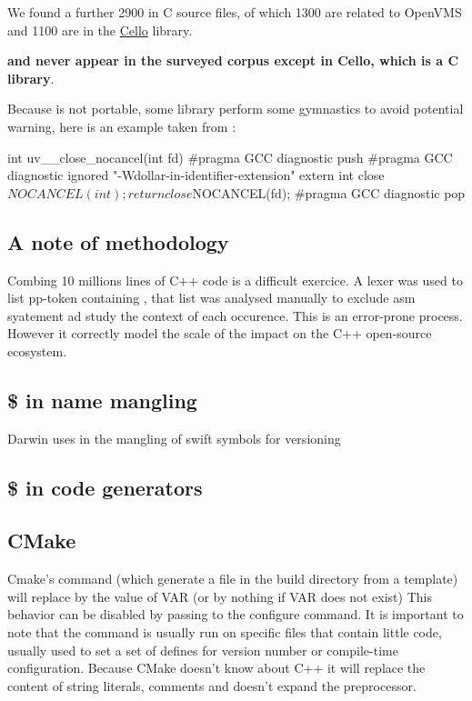 \documentclass{wg21}
\begin{document}
    We found a further 2900 \tcode{\$} in C source files, of which 1300 are related to OpenVMS and 1100 are in the \href{http://libcello.org/}{Cello} library.
    
    \textbf{\tcode{\$\{\}}  and \tcode{\$()} never appear in the surveyed corpus except in Cello, which is a C library}.
    
    Because \tcode{\$} is not portable, some library perform some gymnastics to avoid potential warning, here is an example taken from :
    
    \begin{colorblock}
        int uv__close_nocancel(int fd) {
            #pragma GCC diagnostic push
            #pragma GCC diagnostic ignored "-Wdollar-in-identifier-extension"
            extern int close$NOCANCEL(int);
            return close$NOCANCEL(fd);
            #pragma GCC diagnostic pop
        }
    \end{colorblock}

    
    \subsection{A note of methodology}
    
    Combing 10 millions lines of C++ code is a difficult exercice.
    A lexer was used to list pp-token containing \tcode{\$}, that list was analysed manually to exclude asm syatement ad study the context of each occurence.
    This is an error-prone process.
    However it correctly model the scale of the impact on the C++ open-source ecosystem.
    
    \subsection{\$ in name mangling}
    
    Darwin uses \tcode{_\$} in the mangling of swift symbols for versioning
    
    \subsection{\$ in code generators}
    
    \subsection{CMake}
    
    Cmake's \href{https://cmake.org/cmake/help/latest/command/configure_file.html}{} command (which generate a file in the build directory from a template) will replace  by the value of VAR (or by nothing if VAR does not exist)
    This behavior can be disabled by passing  to the configure command.
    It is important to note that the  command is usually run on specific files that contain little code, usually used to set a set of defines for version number or compile-time configuration. Because CMake doesn't know about C++ it will replace the content of string literals, comments and doesn't expand the preprocessor.
    
\end{document}
